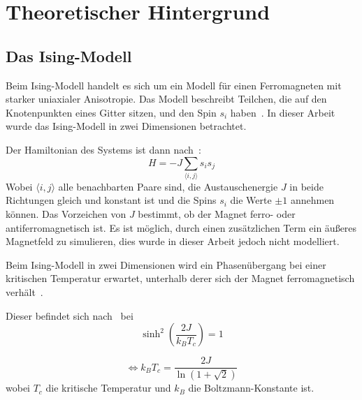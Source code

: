 \chapter{Theoretischer Hintergrund}
	\label{chap:theorie}
	
	\section{Das Ising-Modell}
	\label{sec:isingtheorie}
	Beim Ising-Modell handelt es sich um ein Modell für einen Ferromagneten mit starker uniaxialer Anisotropie. %
	Das Modell beschreibt Teilchen, die auf den Knotenpunkten eines Gitter sitzen, und den Spin $s_i$ haben~\cite[S. 7]{binderheermann}. In dieser Arbeit wurde das Ising-Modell in zwei Dimensionen betrachtet. 
	
	Der Hamiltonian des Systems ist dann nach~\cite[S. 7]{binderheermann}:
	\begin{equation}
	H=-J\sum_{\langle i,j\rangle }s_is_j
	\label{eq:hamiltonianising}
	\end{equation}
	Wobei $\langle i,j\rangle$ alle benachbarten Paare sind, die Austauschenergie $J$ in beide Richtungen gleich und konstant ist und die Spins $s_i$ die  Werte $\pm 1$ annehmen können. Das Vorzeichen von $J$ bestimmt, ob der Magnet ferro- oder antiferromagnetisch ist. Es ist möglich, durch einen zusätzlichen Term ein äußeres Magnetfeld zu simulieren, dies wurde in dieser Arbeit jedoch nicht modelliert.%

	
	Beim Ising-Modell in zwei Dimensionen wird ein Phasenübergang bei einer kritischen Temperatur erwartet, unterhalb derer sich der Magnet ferromagnetisch verhält~\cite[vgl. ][]{peierls_1936}.
	
	Dieser befindet sich nach~\cite{OnsagerCrystal1} bei \[\sinh^2\left(\frac{2J}{k_BT_c}\right) =1\]
	
	\begin{equation}
	\Leftrightarrow k_BT_c=\frac{2J}{\ln(1+\sqrt{2})}
	\label{eq:kritischetemperatur}
	\end{equation}
	wobei $T_c$ die kritische Temperatur und $k_B$ die Boltzmann-Konstante ist.
	
